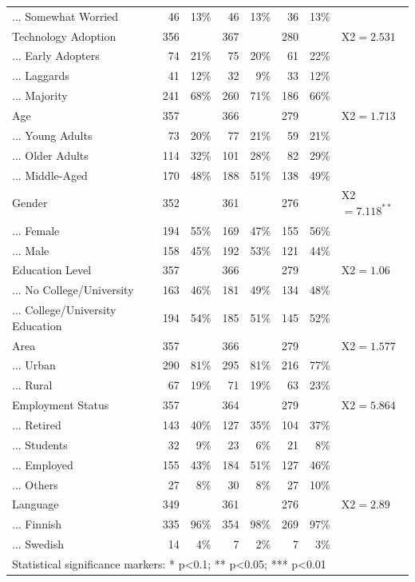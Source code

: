 \begin{table}[!htbp]
{\begin{tabular}{lrrrrrrl}
... Somewhat Worried & 46 & 13\% & 46 & 13\% & 36 & 13\% &  \\ 
Technology Adoption & 356 &  & 367 &  & 280 &  & X2$=2.531^{}$ \\ 
... Early Adopters & 74 & 21\% & 75 & 20\% & 61 & 22\% &  \\ 
... Laggards & 41 & 12\% & 32 & 9\% & 33 & 12\% &  \\ 
... Majority & 241 & 68\% & 260 & 71\% & 186 & 66\% &  \\ 
Age & 357 &  & 366 &  & 279 &  & X2$=1.713^{}$ \\ 
... Young Adults & 73 & 20\% & 77 & 21\% & 59 & 21\% &  \\ 
... Older Adults & 114 & 32\% & 101 & 28\% & 82 & 29\% &  \\ 
... Middle-Aged & 170 & 48\% & 188 & 51\% & 138 & 49\% &  \\ 
Gender & 352 &  & 361 &  & 276 &  & X2$=7.118^{**}$ \\ 
... Female & 194 & 55\% & 169 & 47\% & 155 & 56\% &  \\ 
... Male & 158 & 45\% & 192 & 53\% & 121 & 44\% &  \\ 
Education Level & 357 &  & 366 &  & 279 &  & X2$=1.06^{}$ \\ 
... No College/University & 163 & 46\% & 181 & 49\% & 134 & 48\% &  \\ 
... College/University Education & 194 & 54\% & 185 & 51\% & 145 & 52\% &  \\ 
Area & 357 &  & 366 &  & 279 &  & X2$=1.577^{}$ \\ 
... Urban & 290 & 81\% & 295 & 81\% & 216 & 77\% &  \\ 
... Rural & 67 & 19\% & 71 & 19\% & 63 & 23\% &  \\ 
Employment Status & 357 &  & 364 &  & 279 &  & X2$=5.864^{}$ \\ 
... Retired & 143 & 40\% & 127 & 35\% & 104 & 37\% &  \\ 
... Students & 32 & 9\% & 23 & 6\% & 21 & 8\% &  \\ 
... Employed & 155 & 43\% & 184 & 51\% & 127 & 46\% &  \\ 
... Others & 27 & 8\% & 30 & 8\% & 27 & 10\% &  \\ 
Language & 349 &  & 361 &  & 276 &  & X2$=2.89^{}$ \\ 
... Finnish & 335 & 96\% & 354 & 98\% & 269 & 97\% &  \\ 
... Swedish & 14 & 4\% & 7 & 2\% & 7 & 3\% & \\ 
\hline
\hline
\multicolumn{8}{l}{Statistical significance markers: * p<0.1; ** p<0.05; *** p<0.01}\\ 
\end{tabular}
}
\end{table}


